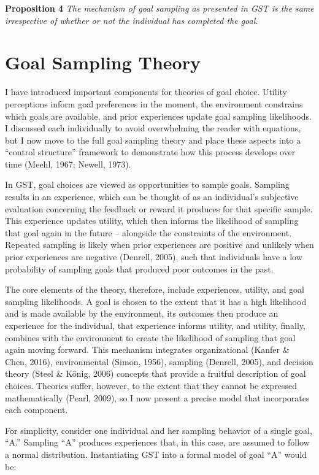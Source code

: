 \documentclass[english,,man]{apa6}
\theoremstyle{definition}
\theoremstyle{definition}
\theoremstyle{definition}
\theoremstyle{remark}
\begin{document}
\textbf{Proposition 4} \emph{The mechanism of goal sampling as presented
in GST is the same irrespective of whether or not the individual has
completed the goal.}

\hypertarget{goal-sampling-theory}{%
\section{Goal Sampling Theory}\label{goal-sampling-theory}}

I have introduced important components for theories of goal choice.
Utility perceptions inform goal preferences in the moment, the
environment constrains which goals are available, and prior experiences
update goal sampling likelihoods. I discussed each individually to avoid
overwhelming the reader with equations, but I now move to the full goal
sampling theory and place these aspects into a \enquote{control
structure} framework to demonstrate how this process develops over time
(Meehl, 1967; Newell, 1973).

In GST, goal choices are viewed as opportunities to sample goals.
Sampling results in an experience, which can be thought of as an
individual's subjective evaluation concerning the feedback or reward it
produces for that specific sample. This experience updates utility,
which then informs the likelihood of sampling that goal again in the
future -- alongside the constraints of the environment. Repeated
sampling is likely when prior experiences are positive and unlikely when
prior experiences are negative (Denrell, 2005), such that individuals
have a low probability of sampling goals that produced poor outcomes in
the past.

The core elements of the theory, therefore, include experiences,
utility, and goal sampling likelihoods. A goal is chosen to the extent
that it has a high likelihood and is made available by the environment,
its outcomes then produce an experience for the individual, that
experience informs utility, and utility, finally, combines with the
environment to create the likelihood of sampling that goal again moving
forward. This mechanism integrates organizational (Kanfer \& Chen,
2016), environmental (Simon, 1956), sampling (Denrell, 2005), and
decision theory (Steel \& König, 2006) concepts that provide a fruitful
description of goal choices. Theories suffer, however, to the extent
that they cannot be expressed mathematically (Pearl, 2009), so I now
present a precise model that incorporates each component.

For simplicity, consider one individual and her sampling behavior of a
single goal, \enquote{A.} Sampling \enquote{A} produces experiences
that, in this case, are assumed to follow a normal distribution.
Instantiating GST into a formal model of goal \enquote{A} would be:
\end{document}
